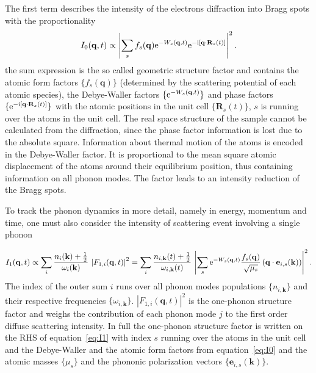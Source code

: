 The first term describes the intensity of the electrons diffraction into Bragg spots with the proportionality
\begin{equation} I_0(\mathbf{q}, t) \propto \left| \sum_s f_s(\mathbf{q}) \mathrm{e}^{-W_s(\mathbf{q},t)} \mathrm{e}^{-\mathrm{i}[\mathbf{q}\cdot\mathbf{R}_s(t)]} \right| ^2.\label{eq:I0}\end{equation}
the sum expression is the so called geometric structure factor and contains the atomic form factors $\{f_s(\mathbf{q})\}$ (determined by the scattering potential of each atomic species), the Debye-Waller factors $\{\mathrm{e}^{-W_s(\mathbf{q},t)}\}$ and phase factors $\{\mathrm{e}^{-\mathrm{i}[\mathbf{q}\cdot\mathbf{R}_s(t)]}\}$ with the atomic positions in the unit cell $\{\mathbf{R}_s(t)\}$, $s$ is running over the atoms in the unit cell.
The real space structure of the sample cannot be calculated from the diffraction, since the phase factor information is lost due to the absolute square.
Information about thermal motion of the atoms is encoded in the Debye-Waller factor.
It is proportional to the mean square atomic displacement of the atoms around their equilibrium position, thus containing information on all phonon modes.
The factor leads to an intensity reduction of the Bragg spots.

To track the phonon dynamics in more detail, namely in energy, momentum and time, one must also consider the intensity of scattering event involving a single phonon

\begin{equation} I_1(\mathbf{q},t) \propto \sum_i \frac{n_i(\mathbf{k})+\frac{1}{2}}{\omega_i(\mathbf{k})}\,\left| F_{1,i}(\mathbf{q},t) \right|^2 = \sum_i \frac{n_{i,\mathbf{k}}(t)+\frac{1}{2}}{\omega_{i,\mathbf{k}}(t)}\,\left| \sum_s \mathrm{e}^{-W_s(\mathbf{q},t)} \frac{f_s(\mathbf{q})}{\sqrt{\mu_s}} \left( \mathbf{q}\cdot\mathbf{e}_{i, s}(\mathbf{k}) \right) \right|^2.\label{eq:I1}\end{equation}
The index of the outer sum $i$ runs over all phonon modes populations $\{n_{i,\mathbf{k}}\}$ and their respective frequencies $\{\omega_{i,\mathbf{k}}\}$.
$\left| F_{1,i}(\mathbf{q},t) \right|^2$ is the one-phonon structure factor and weighs the contribution of each phonon mode $j$ to the first order diffuse scattering intensity.
In full the one-phonon structure factor is written on the RHS of equation~\ref{eq:I1} with index $s$ running over the atoms in the unit cell and the Debye-Waller and the atomic form factors from equation~\ref{eq:I0} and the atomic masses $\{\mu_s\}$ and the phononic polarization vectors $\{\mathbf{e}_{i, s}(\mathbf{k})\}$.

